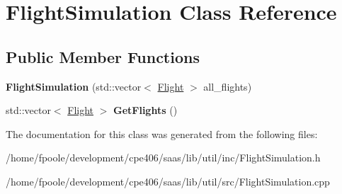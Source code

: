 \hypertarget{class_flight_simulation}{}\section{Flight\+Simulation Class Reference}
\label{class_flight_simulation}
\subsection*{Public Member Functions}
\begin{DoxyCompactItemize}
\item 
\hypertarget{class_flight_simulation_acdc2225b69c72b3d127d8f7dfb2770fb}{}{\bfseries Flight\+Simulation} (std\+::vector$<$ \hyperlink{class_flight}{Flight} $>$ all\+\_\+flights)\label{class_flight_simulation_acdc2225b69c72b3d127d8f7dfb2770fb}

\item 
\hypertarget{class_flight_simulation_a0ead885f2ebfbdc23a8e191685e62909}{}std\+::vector$<$ \hyperlink{class_flight}{Flight} $>$ {\bfseries Get\+Flights} ()\label{class_flight_simulation_a0ead885f2ebfbdc23a8e191685e62909}

\end{DoxyCompactItemize}


The documentation for this class was generated from the following files\+:\begin{DoxyCompactItemize}
\item 
/home/fpoole/development/cpe406/saas/lib/util/inc/Flight\+Simulation.\+h\item 
/home/fpoole/development/cpe406/saas/lib/util/src/Flight\+Simulation.\+cpp\end{DoxyCompactItemize}
